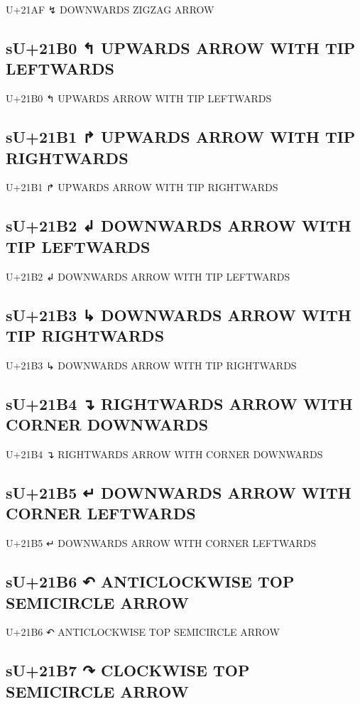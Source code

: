 U+21AF ↯ DOWNWARDS ZIGZAG ARROW

\subsection{sU+21B0 ↰ UPWARDS ARROW WITH TIP LEFTWARDS}

U+21B0 ↰ UPWARDS ARROW WITH TIP LEFTWARDS

\subsection{sU+21B1 ↱ UPWARDS ARROW WITH TIP RIGHTWARDS}

U+21B1 ↱ UPWARDS ARROW WITH TIP RIGHTWARDS

\subsection{sU+21B2 ↲  DOWNWARDS ARROW WITH TIP LEFTWARDS}

U+21B2 ↲  DOWNWARDS ARROW WITH TIP LEFTWARDS

\subsection{sU+21B3 ↳  DOWNWARDS ARROW WITH TIP RIGHTWARDS}

U+21B3 ↳  DOWNWARDS ARROW WITH TIP RIGHTWARDS

\subsection{sU+21B4 ↴  RIGHTWARDS ARROW WITH CORNER DOWNWARDS}

U+21B4 ↴  RIGHTWARDS ARROW WITH CORNER DOWNWARDS

\subsection{sU+21B5 ↵ DOWNWARDS ARROW WITH CORNER LEFTWARDS}

U+21B5 ↵ DOWNWARDS ARROW WITH CORNER LEFTWARDS

\subsection{sU+21B6 ↶ ANTICLOCKWISE TOP SEMICIRCLE ARROW}

U+21B6 ↶ ANTICLOCKWISE TOP SEMICIRCLE ARROW

\subsection{sU+21B7 ↷ CLOCKWISE TOP SEMICIRCLE ARROW}

